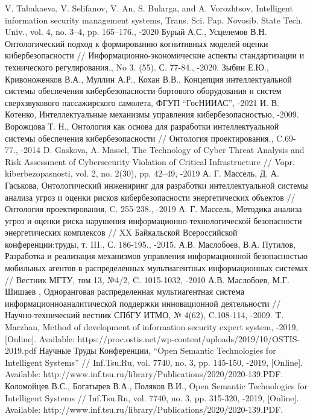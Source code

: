 \begin{thebibliography}{}
V. Tabakaeva, V. Selifanov, V. An, S. Bularga, and A. Vorozhtsov,
Intelligent information security management systems,  Trans. Sci. Pap. Novosib. State Tech. Univ., vol. 4,
no. 3–4, pp. 165–176., -2020
Бурый А.С., Усцелемов В.Н. Онтологический подход к формированию когнитивных моделей оценки
кибербезопасности // Информационно-экономические аспекты стандартизации и технического
регулирования.,  No 3. (55). С. 77-84., -2020.
Зыбин Е.Ю., Кривоноженков В.А., Муллин А.Р., Кохан В.В., Концепция
интеллектуальной системы обеспечения кибербезопасности бортового оборудования
и систем сверхзвукового пассажирского самолета, ФГУП ``ГосНИИАС'', -2021
И. В. Котенко, Интеллектуальные механизмы управления кибербезопасностью, -2009.
Ворожцова Т. Н., Онтология как основа для разработки интеллектуальной системы обеспечения
кибербезопасности // Онтология проектирования., C.69-77., -2014
D. Gaskova, A. Massel, The Technology of Cyber Threat Analysis and Risk Assessment of Cybersecurity
Violation of Critical Infrastructure // Vopr. kiberbezopasnosti, vol. 2, no. 2(30), pp. 42–49, -2019
А. Г. Массель, Д. А. Гаськова, Онтологический инжениринг для разработки интеллектуальной системы анализа угроз
и оценки рисков кибербезопасности энергетических объектов // Онтология проектирования, C. 255-238., -2019
А. Г. Массель, Методика анализа угроз и оценки риска нарушения информационно-технологической
безопасности энергетических комплексов // XX Байкальской Всероссийской конференции:труды,
т. III., С. 186-195., -2015.
А.В. Маслобоев, В.А. Путилов, Разработка и реализация механизмов управления информационной безопасностью
мобильных агентов в распределенных мультиагентных информационных системах // Вестник МГТУ, том 13, №4/2,
C. 1015-1032, -2010
А.В. Маслобоев, М.Г. Шишаев ,  Одноранговая распределенная мультиагентная система
информационноаналитической поддержки инновационной деятельности //
Научно-технический вестник СПбГУ ИТМО, № 4(62), C.108-114, -2009.
T. Marzhan, Method of development of information security expert system, -2019, [Online].
Available: https://proc.ostis.net/wp-content/uploads/2019/10/OSTIS-2019.pdf
Научные Труды Конференции, “Open Semantic Technologies for Intelligent Systems”
// Inf.Tsu.Ru, vol. 7740, no. 3, pp. 145-150, -2019,
[Online]. Available: http://www.inf.tsu.ru/library/Publications/2020/2020-139.PDF.
Коломойцев В.С., Богатырев В.А., Поляков В.И., Open Semantic Technologies for Intelligent Systems
// Inf.Tsu.Ru, vol. 7740, no. 3, pp. 315-320, -2019,
[Online]. Available: http://www.inf.tsu.ru/library/Publications/2020/2020-139.PDF.
\end{thebibliography}


